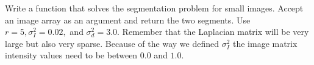 
\begin{problem}  Write a function  that solves the segmentation problem for small images.
Accept an image array as an argument and return the two segments.
Use $r = 5, \sigma_I^2 = 0.02,$ and $\sigma_d^2 = 3.0$.
Remember that the Laplacian matrix will be very large but also very sparse.
Because of the way we defined $\sigma_I^2$ the image matrix intensity values need to be between $0.0$ and $1.0$.
\end{problem}
